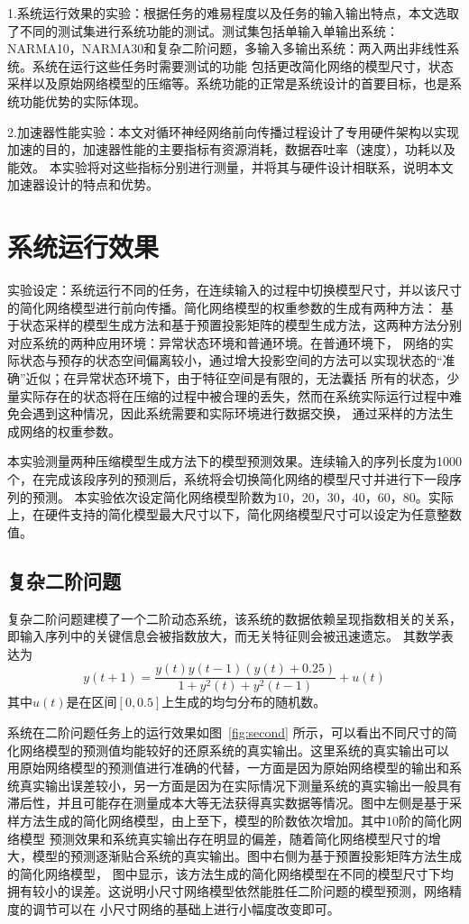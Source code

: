 1.系统运行效果的实验：根据任务的难易程度以及任务的输入输出特点，本文选取了不同的测试集进行系统功能的测试。测试集包括单输入单输出系统：
NARMA10，NARMA30和复杂二阶问题，多输入多输出系统：两入两出非线性系统。系统在运行这些任务时需要测试的功能
包括更改简化网络的模型尺寸，状态采样以及原始网络模型的压缩等。系统功能的正常是系统设计的首要目标，也是系统功能优势的实际体现。

2.加速器性能实验：本文对循环神经网络前向传播过程设计了专用硬件架构以实现加速的目的，加速器性能的主要指标有资源消耗，数据吞吐率（速度），功耗以及能效。
本实验将对这些指标分别进行测量，并将其与硬件设计相联系，说明本文加速器设计的特点和优势。

\section{系统运行效果}
实验设定：系统运行不同的任务，在连续输入的过程中切换模型尺寸，并以该尺寸的简化网络模型进行前向传播。简化网络模型的权重参数的生成有两种方法：
基于状态采样的模型生成方法和基于预置投影矩阵的模型生成方法，这两种方法分别对应系统的两种应用环境：异常状态环境和普通环境。在普通环境下，
网络的实际状态与预存的状态空间偏离较小，通过增大投影空间的方法可以实现状态的“准确”近似；在异常状态环境下，由于特征空间是有限的，无法囊括
所有的状态，少量实际存在的状态将在压缩的过程中被合理的丢失，然而在系统实际运行过程中难免会遇到这种情况，因此系统需要和实际环境进行数据交换，
通过采样的方法生成网络的权重参数。

本实验测量两种压缩模型生成方法下的模型预测效果。连续输入的序列长度为1000个，在完成该段序列的预测后，系统将会切换简化网络的模型尺寸并进行下一段序列的预测。
本实验依次设定简化网络模型阶数为10，20，30，40，60，80。实际上，在硬件支持的简化模型最大尺寸以下，简化网络模型尺寸可以设定为任意整数值。

\subsection{复杂二阶问题}
复杂二阶问题建模了一个二阶动态系统，该系统的数据依赖呈现指数相关的关系，即输入序列中的关键信息会被指数放大，而无关特征则会被迅速遗忘。
其数学表达为
\begin{equation}
	y(t+1) = \frac{y(t)y(t-1)(y(t)+0.25)}{1+y^2(t)+y^2(t-1)} + u(t)
\end{equation}
其中\(u(t)\)是在区间\([0,0.5]\)上生成的均匀分布的随机数。


系统在二阶问题任务上的运行效果如图~\ref{fig:second} 所示，可以看出不同尺寸的简化网络模型的预测值均能较好的还原系统的真实输出。这里系统的真实输出可以
用原始网络模型的预测值进行准确的代替，一方面是因为原始网络模型的输出和系统真实输出误差较小，另一方面是因为在实际情况下测量系统的真实输出一般具有
滞后性，并且可能存在测量成本大等无法获得真实数据等情况。图中左侧是基于采样方法生成的简化网络模型，由上至下，模型的阶数依次增加。其中10阶的简化网络模型
预测效果和系统真实输出存在明显的偏差，随着简化网络模型尺寸的增大，模型的预测逐渐贴合系统的真实输出。图中右侧为基于预置投影矩阵方法生成的简化网络模型，
图中显示，该方法生成的简化网络模型在不同的模型尺寸下均拥有较小的误差。这说明小尺寸网络模型依然能胜任二阶问题的模型预测，网络精度的调节可以在
小尺寸网络的基础上进行小幅度改变即可。

